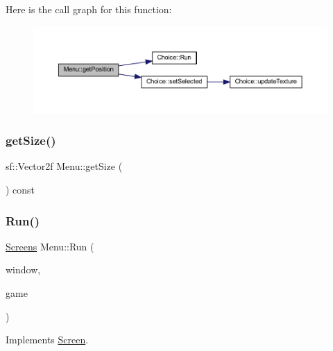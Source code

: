 Here is the call graph for this function\+:\nopagebreak
\begin{figure}[H]
\begin{center}
\leavevmode
\includegraphics[width=350pt]{class_menu_a589f53bbd6436b381b5ec92a609d5d66_cgraph}
\end{center}
\end{figure}
\mbox{\label{class_menu_ad99768326c994acf4fba6d9df60d1bcc}} 
\subsubsection{\texorpdfstring{get\+Size()}{getSize()}}
{\footnotesize\ttfamily sf\+::\+Vector2f Menu\+::get\+Size (\begin{DoxyParamCaption}{ }\end{DoxyParamCaption}) const}

\mbox{\label{class_menu_ab8d843dd1787490b96a1e5c70eed5879}} 
\subsubsection{\texorpdfstring{Run()}{Run()}}
{\footnotesize\ttfamily \hyperlink{_globals_8h_a3d5776bab98402b03be09156bacf4f68}{Screens} Menu\+::\+Run (\begin{DoxyParamCaption}\item[{sf\+::\+Render\+Window \&}]{window,  }\item[{\hyperlink{class_game__window}{Game\+\_\+window} \&}]{game }\end{DoxyParamCaption})\hspace{0.3cm}{\ttfamily [virtual]}}



Implements \hyperlink{class_screen_aadaffbe93949a54f04e2a87c5602f610}{Screen}.

\mbox{\label{class_menu_ab2b8f2fc48dfbf397a81e9a1b638f970}} 
